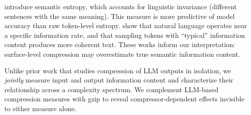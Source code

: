 \citet{kuhn2023semantic} introduce semantic entropy, which accounts for linguistic invariance (different sentences with the same meaning). This measure is more predictive of model accuracy than raw token-level entropy. \citet{meister2023locally} show that natural language operates near a specific information rate, and that sampling tokens with ``typical'' information content produces more coherent text. These works inform our interpretation: surface-level compression may overestimate true semantic information content.

Unlike prior work that studies compression of LLM outputs in isolation, we \emph{jointly} measure input and output information content and characterize their relationship across a complexity spectrum. We complement LLM-based compression measures with gzip to reveal compressor-dependent effects invisible to either measure alone.

